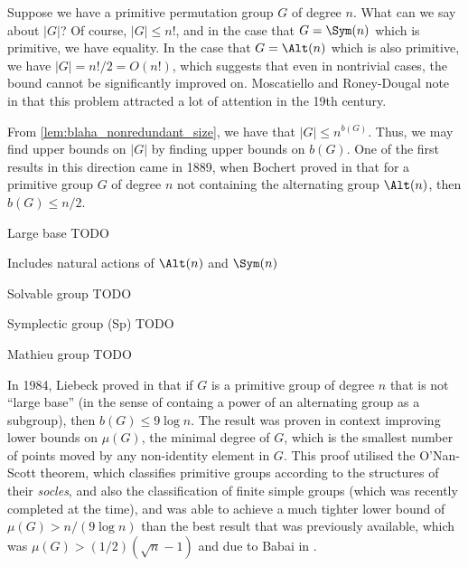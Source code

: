 Suppose we have a primitive permutation group $G$ of degree $n$. What can we say about $|G|$? Of course, $|G| \leq n!$, and in the case that $G = \Sym(n)$ which is primitive, we have equality. In the case that $G = \Alt(n)$ which is also primitive, we have $|G| = n!/2 = O(n!)$, which suggests that even in nontrivial cases, the bound cannot be significantly improved on. Moscatiello and Roney-Dougal note in \cite{moscatiello_roney-dougal2021} that this problem attracted a lot of attention in the 19th century.

From \autoref{lem:blaha_nonredundant_size}, we have that $|G| \leq n^{b(G)}$. Thus, we may find upper bounds on $|G|$ by finding upper bounds on $b(G)$. One of the first results in this direction came in 1889, when Bochert proved in \cite{bochert1889} that for a primitive group $G$ of degree $n$ not containing the alternating group $\Alt(n)$, then $b(G) \leq n/2$.

\begin{definition}
    Large base TODO

    Includes natural actions of $\Alt(n)$ and $\Sym(n)$
\end{definition}

\begin{definition}
    Solvable group TODO
\end{definition}

\begin{definition}
    Symplectic group (Sp) TODO
\end{definition}

\begin{definition}
    Mathieu group TODO
\end{definition}

In 1984, Liebeck proved in \cite{liebeck1984} that if $G$ is a primitive group of degree $n$ that is not ``large base'' (in the sense of containg a power of an alternating group as a subgroup), then $b(G) \leq 9\log n$. The result was proven in context improving lower bounds on $\mu(G)$, the minimal degree of $G$, which is the smallest number of points moved by any non-identity element in $G$. This proof utilised the O'Nan-Scott theorem, which classifies primitive groups according to the structures of their \textit{socles}, and also the classification of finite simple groups (which was recently completed at the time), and was able to achieve a much tighter lower bound of $\mu(G) > n/(9 \log n)$ than the best result that was previously available, which was $\mu(G) > (1/2)(\sqrt{n} - 1)$ and due to Babai in \cite{babai1981}.

